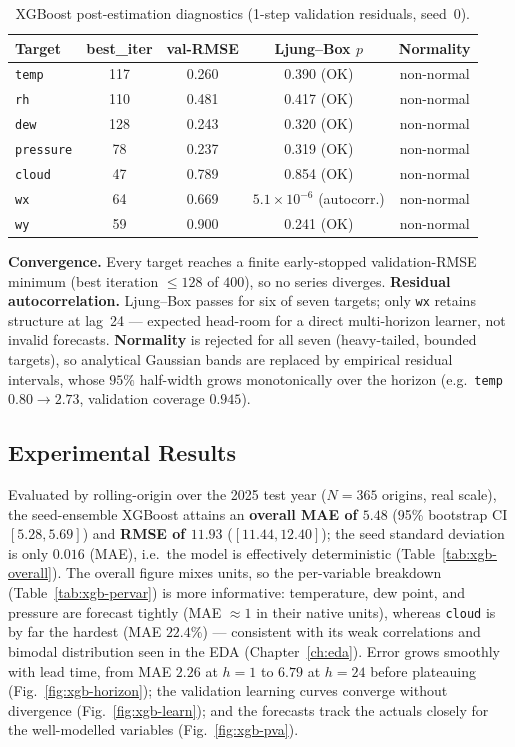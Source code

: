 \documentclass[12pt,a4paper,oneside]{report}
\begin{document}
\begin{table}[H]
\centering
\caption{XGBoost post-estimation diagnostics (1-step validation residuals, seed~0).}
\label{tab:xgb-diag}
\begin{tabular}{lcccc}
\toprule
\textbf{Target} & \textbf{best\_iter} & \textbf{val-RMSE} &
\textbf{Ljung--Box $p$} & \textbf{Normality} \\
\midrule
\texttt{temp}     & 117 & 0.260 & 0.390 (OK)      & non-normal \\
\texttt{rh}       & 110 & 0.481 & 0.417 (OK)      & non-normal \\
\texttt{dew}      & 128 & 0.243 & 0.320 (OK)      & non-normal \\
\texttt{pressure} &  78 & 0.237 & 0.319 (OK)      & non-normal \\
\texttt{cloud}    &  47 & 0.789 & 0.854 (OK)      & non-normal \\
\texttt{wx}       &  64 & 0.669 & $5.1{\times}10^{-6}$ (autocorr.) & non-normal \\
\texttt{wy}       &  59 & 0.900 & 0.241 (OK)      & non-normal \\
\bottomrule
\end{tabular}
\end{table}

\textbf{Convergence.} Every target reaches a finite early-stopped validation-RMSE
minimum (best iteration $\le 128$ of $400$), so no series diverges.
\textbf{Residual autocorrelation.} Ljung--Box passes for six of seven targets;
only \texttt{wx} retains structure at lag~24 --- expected head-room for a direct
multi-horizon learner, not invalid forecasts. \textbf{Normality} is rejected for
all seven (heavy-tailed, bounded targets), so analytical Gaussian bands are
replaced by empirical residual intervals, whose $95\%$ half-width grows
monotonically over the horizon (e.g.\ \texttt{temp} $0.80 \to 2.73$, validation
coverage $0.945$).

\subsection{Experimental Results}
\label{sec:xgb-results}
Evaluated by rolling-origin over the 2025 test year ($N=365$ origins, real scale),
the seed-ensemble XGBoost attains an \textbf{overall MAE of $5.48$} (95\% bootstrap
CI $[5.28, 5.69]$) and \textbf{RMSE of $11.93$} ($[11.44, 12.40]$); the seed
standard deviation is only $0.016$ (MAE), i.e.\ the model is effectively
deterministic (Table~\ref{tab:xgb-overall}). The overall figure mixes units, so the
per-variable breakdown (Table~\ref{tab:xgb-pervar}) is more informative:
temperature, dew point, and pressure are forecast tightly (MAE $\approx 1$ in their
native units), whereas \texttt{cloud} is by far the hardest (MAE $22.4\%$) ---
consistent with its weak correlations and bimodal distribution seen in the EDA
(Chapter~\ref{ch:eda}). Error grows smoothly with lead time, from MAE $2.26$ at
$h{=}1$ to $6.79$ at $h{=}24$ before plateauing (Fig.~\ref{fig:xgb-horizon}); the
validation learning curves converge without divergence
(Fig.~\ref{fig:xgb-learn}); and the forecasts track the actuals closely for the
well-modelled variables (Fig.~\ref{fig:xgb-pva}).
\end{document}
